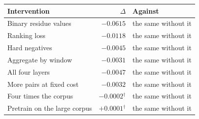\begin{tabular}{lrl}
\toprule
    \textbf{Intervention} & \textbf{$\Delta$} & \textbf{Against} \\
\midrule
    Binary residue values & $-0.0615$ & the same without it \\
    Ranking loss & $-0.0118$ & the same without it \\
    Hard negatives & $-0.0045$ & the same without it \\
    Aggregate by window & $-0.0031$ & the same without it \\
    All four layers & $-0.0047$ & the same without it \\
    More pairs at fixed cost & $-0.0032$ & the same without it \\
    Four times the corpus & $-0.0002$$^{\dagger}$ & the same without it \\
    Pretrain on the large corpus & $+0.0001$$^{\dagger}$ & the same without it \\
\bottomrule
\end{tabular}
